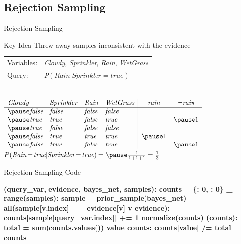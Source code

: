 \documentclass[14pt]{beamer}
\begin{document}
\subsection{Rejection Sampling}
\begin{frame}[fragile]{Rejection Sampling}
	\begin{block}{Key Idea}
		Throw away samples inconsistent with the evidence
	\end{block}
	\medskip
	\pause
	\begin{tabular}{ll}
		Variables: & \textit{Cloudy}, \textit{Sprinkler}, \textit{Rain}, \textit{WetGrass} \\
		Query:     & $P(\textit{Rain}|\textit{Sprinkler}\!=\!\textit{true})$
	\end{tabular}
	\\
	\medskip
	$
	\begin{array}{llll|cc}
		\textit{Cloudy} & \textit{Sprinkler} & \textit{Rain}  & \textit{WetGrass} & \textit{rain} & \lnot\textit{rain} \\
		\hline
		\pause
		\textit{false}  & \textit{false}     & \textit{false} & \textit{false}    &           &            \\
		\pause
		\textit{true}   & \textit{true}      & \textit{false} & \textit{true}     &           & \pause 1   \\
		\pause
		\textit{true}   & \textit{false}     & \textit{false} & \textit{false}    &           &            \\
		\pause
		\textit{false}  & \textit{true}      & \textit{true}  & \textit{true}     & \pause 1  &            \\
		\pause
		\textit{false}  & \textit{true}      & \textit{false} & \textit{true}     &           & \pause 1
	\end{array}
	$
	\\
	\medskip
	\pause
	\tab$P(\textit{Rain}\!=\!\textit{true}|\textit{Sprinkler}\!=\!\textit{true})=\pause\frac{1}{1 + 1 + 1}=\frac{1}{3}$
\end{frame}
\begin{frame}[fragile]{Rejection Sampling Code}
	\begin{semiverbatim}\scriptsize\bfseries
		 (query_var, evidence, bayes_net, samples):
		    \pause{}
		    counts = \{: \num{0}, : \num{0}\}
		     _  range(samples):
		        sample = prior_sample(bayes_net)
		        \pause{}
		         all(sample[v.index] == evidence[v]  v  evidence):
		            counts[sample[query_var.index]] += \num{1}
		    \pause{}
		     normalize(counts)
		\pause
		 (counts):
		    \pause{}
		    total = sum(counts.values())
		     value  counts:
		        counts[value] /= total
		    \pause{}
		     counts
	\end{semiverbatim}
\end{frame}
\end{document}
